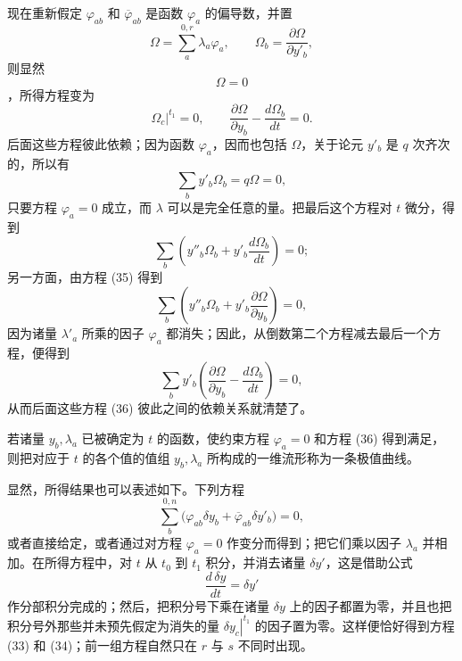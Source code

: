 \documentclass[11pt,a4paper,leqno]{article}
\begin{document}
现在重新假定 $\varphi_{ab}$ 和 $\overline{\varphi}_{ab}$ 是函数 $\varphi_a$ 的偏导数，并置
\[
\Omega=\sum_a^{0,r}\lambda_a\varphi_a,
\qquad
\Omega_b=\frac{\partial\Omega}{\partial y'_b},
\]
则显然
\begin{equation}\tag{35}
\Omega=0
\end{equation}
，所得方程变为
\begin{equation}\tag{36}
\left.\Omega_c\right|^{t_1}=0,
\qquad
\frac{\partial\Omega}{\partial y_b}-\frac{d\Omega_b}{dt}=0.
\end{equation}
后面这些方程彼此依赖；因为函数 $\varphi_a$，因而也包括 $\Omega$，关于论元 $y'_b$ 是 $q$ 次齐次的，所以有
\begin{equation}\tag{37}
\sum_b y'_b\Omega_b=q\Omega=0,
\end{equation}
只要方程 $\varphi_a=0$ 成立，而 $\lambda$ 可以是完全任意的量。把最后这个方程对 $t$ 微分，得到
\[
\sum_b\left(y''_b\Omega_b+y'_b\frac{d\Omega_b}{dt}\right)=0;
\]
另一方面，由方程 (35) 得到
\[
\sum_b\left(y''_b\Omega_b+y'_b\frac{\partial\Omega}{\partial y_b}\right)=0,
\]
因为诸量 $\lambda'_a$ 所乘的因子 $\varphi_a$ 都消失；因此，从倒数第二个方程减去最后一个方程，便得到
\begin{equation}\tag{38}
\sum_b y'_b
\left(
\frac{\partial\Omega}{\partial y_b}-\frac{d\Omega_b}{dt}
\right)=0,
\end{equation}
从而后面这些方程 (36) 彼此之间的依赖关系就清楚了。

若诸量 $y_b,\lambda_a$ 已被确定为 $t$ 的函数，使约束方程 $\varphi_a=0$ 和方程 (36) 得到满足，则把对应于 $t$ 的各个值的值组 $y_b,\lambda_a$ 所构成的一维流形称为一条极值曲线。

显然，所得结果也可以表述如下。下列方程
\[
\sum_b^{0,n}\bigl(\varphi_{ab}\delta y_b+\overline{\varphi}_{ab}\delta y'_b\bigr)=0,
\]
或者直接给定，或者通过对方程 $\varphi_a=0$ 作变分而得到；把它们乘以因子 $\lambda_a$ 并相加。在所得方程中，对 $t$ 从 $t_0$ 到 $t_1$ 积分，并消去诸量 $\delta y'$，这是借助公式
\[
\frac{d\,\delta y}{dt}=\delta y'
\]
作分部积分完成的；然后，把积分号下乘在诸量 $\delta y$ 上的因子都置为零，并且也把积分号外那些并未预先假定为消失的量 $\left.\delta y_c\right|^{t_1}$ 的因子置为零。这样便恰好得到方程 (33) 和 (34)；前一组方程自然只在 $r$ 与 $s$ 不同时出现。
\end{document}

